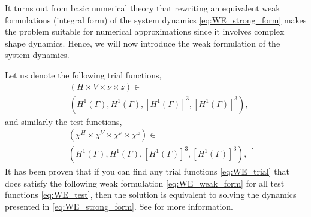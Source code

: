 It turns out from basic numerical theory that rewriting an equivalent weak formulations (integral form) of the system dynamics \eqref{eq:WE_strong_form} makes the problem suitable for numerical approximations since it involves complex shape dynamics.
Hence, we will now introduce the weak formulation of the system dynamics.

Let us denote the following trial functions,
\begin{equation}
\label{eq:WE_trial}
    \begin{split}
& ( H \times V \times \nu  \times z ) \in \\
&\left( H^{1}\left( \Gamma  \right), H^1 \left( \Gamma  \right), \left[ H^{1} \left( \Gamma  \right)  \right] ^3, \left[ H^{1}\left( \Gamma  \right)  \right]^3   \right),
    \end{split}
\end{equation}
and similarly the test functions,
\begin{equation}
\label{eq:WE_test}
    \begin{split}
& ( \chi^{H}  \times \chi ^{V} \times \chi ^{\nu }  \times \chi ^{z} ) \in \\
 &\left( H^{1}\left( \Gamma  \right), H^1 \left( \Gamma  \right), \left[ H^{1} \left( \Gamma  \right)  \right] ^3, \left[ H^{1}\left( \Gamma  \right)  \right]^3   \right),
    \end{split}
.\end{equation}
 It has been proven that if you can find any trial functions \eqref{eq:WE_trial} that does satisfy the following weak formulation \eqref{eq:WE_weak_form} for all test functions \eqref{eq:WE_test}, then the solution is equivalent to solving the dynamics presented in \eqref{eq:WE_strong_form}. See \cite{kovacs2021convergent} for more information.

